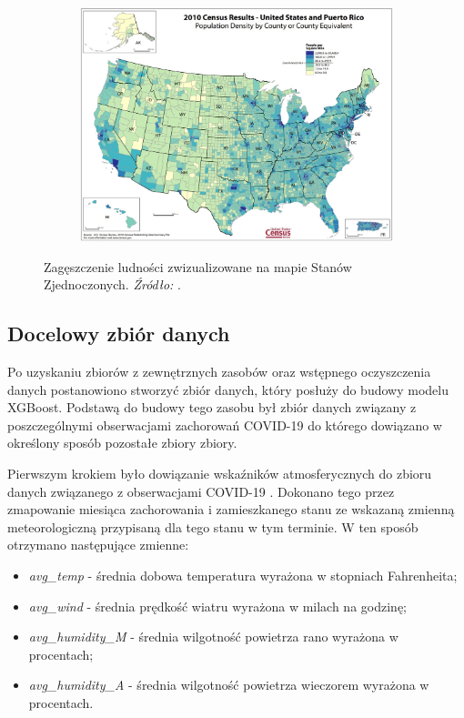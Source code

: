 \documentclass[polish, twoside, 12pt, a4paper]{article}
\theoremstyle{definition}
\theoremstyle{plain}
\theoremstyle{remark}
\begin{document}
\begin{figure}[H]
  \centering
  \begin{subfigure}[t]{\textwidth}
    \includegraphics[width=15cm]{us-desity.jpg}
  \end{subfigure}
  \captionsetup{margin=10pt,font=small,labelfont=bf,width=.8\textwidth}
  \caption{Zagęszczenie ludności zwizualizowane na mapie Stanów Zjednoczonych. \textit{Źródło:} \cite{USCB2021}.}\label{fig:figure:xx5}
\end{figure}

\subsection{Docelowy zbiór danych}

Po uzyskaniu zbiorów z zewnętrznych zasobów oraz wstępnego oczyszczenia danych postanowiono stworzyć zbiór danych, który posłuży do budowy modelu XGBoost. Podstawą do budowy tego zasobu był zbiór danych związany z poszczególnymi obserwacjami zachorowań COVID-19 do którego dowiązano w określony sposób pozostałe zbiory zbiory.

Pierwszym krokiem było dowiązanie wskaźników atmosferycznych do zbioru danych związanego z obserwacjami COVID-19 . Dokonano tego przez zmapowanie miesiąca zachorowania i zamieszkanego stanu ze wskazaną zmienną meteorologiczną przypisaną dla tego stanu w tym terminie. W ten sposób otrzymano następujące zmienne:
\begin{itemize}[noitemsep]
  \item \emph{avg\_temp} - średnia dobowa temperatura wyrażona w stopniach Fahrenheita;
  \item \emph{avg\_wind} - średnia prędkość wiatru wyrażona w milach na godzinę;
  \item \emph{avg\_humidity\_M} - średnia wilgotność powietrza rano wyrażona w procentach;
  \item \emph{avg\_humidity\_A} - średnia wilgotność powietrza wieczorem wyrażona w procentach.
\end{itemize}
\end{document}
